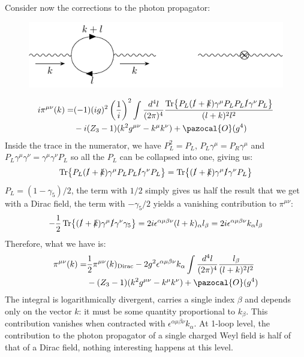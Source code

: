 \documentclass[../main.tex]{subfiles}
\begin{document}
Consider now the corrections to the photon propagator:
\begin{figure}[h]
    \centering
    \includegraphics{Images/photoprop.pdf}
    \caption*{}
\end{figure}
\begin{align*}
i\pi^{\mu\nu}(k)=&(-1)(ig)^2\left(\frac{1}{i}\right)^2\int\frac{d^4l}{(2\pi)^4}\frac{\Tr{P_L(\slashed{l}+\slashed{k})\gamma^\mu P_LP_L\slashed{l}\gamma^\nu P_L}}{(l+k)^2l^2}\\
&-i(Z_3-1)(k^2g^{\mu\nu}-k^\mu k^\nu)+\pazocal{O}(g^4)
\end{align*}
Inside the trace in the numerator, we have $P_L^2=P_L$, $P_L\gamma^\mu=P_R\gamma^\mu$ and $P_L\gamma^\mu\gamma^\nu=\gamma^\mu\gamma^\nu P_L$ so all the $P_L$ can be collapsed into one, giving us:
\[
\Tr{P_L(\slashed{l}+\slashed{k})\gamma^\mu P_LP_L\slashed{l}\gamma^\nu P_L}=\Tr{(\slashed{l}+\slashed{k})\gamma^\mu\slashed{l}\gamma^\nu P_L}
\]
$P_L=(1-\gamma_5)/2$, the term with $1/2$ simply gives us half the result that we get with a Dirac field, the term with $-\gamma_5/2$ yields a vanishing contribution to $\pi^{\mu\nu}$:
\[
-\frac{1}{2}\Tr{(\slashed{l}+\slashed{k})\gamma^\mu\slashed{l}\gamma^\nu\gamma_5}=2i\epsilon^{\alpha\mu\beta\nu}(l+k)_\alpha l_\beta=2i\epsilon^{\alpha\mu\beta\nu}k_\alpha l_\beta
\]
Therefore, what we have is:
\begin{align*}
\pi^{\mu\nu}(k)=&\frac{1}{2}\pi^{\mu\nu}(k)_{\text{Dirac}}-2g^2\epsilon^{\alpha\mu\beta\nu}k_\alpha\int\frac{d^4l}{(2\pi)^4}\frac{l_\beta}{(l+k)^2l^2}\\
&-(Z_3-1)(k^2g^{\mu\nu}-k^\mu k^\nu)+\pazocal{O}(g^4)
\end{align*}
The integral is logarithmically divergent, carries a single index $\beta$ and depends only on the vector $k$: it must be some quantity proportional to $k_\beta$. This contribution vanishes when contracted with $\epsilon^{\alpha\mu\beta\nu}k_\alpha$. At 1-loop level, the contribution to the photon propagator of a single charged Weyl field is half of that of a Dirac field, nothing interesting happens at this level.
\end{document}
